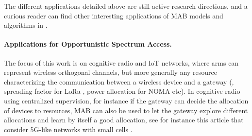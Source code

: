 

The different applications detailed above are still active research directions,
and a curious reader can find other interesting applications of MAB models and algorithms in \cite{bouneffouf2019survey}.


\paragraph{Applications for Opportunistic Spectrum Access.}

The focus of this work is on cognitive radio and IoT networks, where arms can represent wireless orthogonal channels, but more generally any resource characterizing the communication between a wireless device and a gateway (\eg, spreading factor for LoRa \cite{KerkoucheAlami18}, power allocation for NOMA etc). In cognitive radio using centralized supervision, for instance if the gateway can decide the allocation of devices to resources, MAB can also be used to let the gateway explore different allocations and learn by itself a good allocation, see for instance this article that consider 5G-like networks with small cells \cite{Maghsudi16}.

